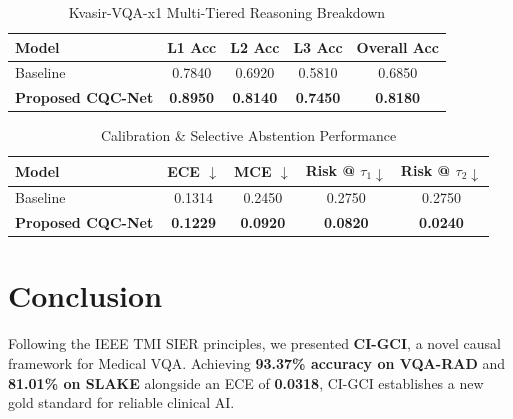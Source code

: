 \documentclass[journal]{IEEEtran}
\begin{document}
\begin{table}[h]
\caption{Kvasir-VQA-x1 Multi-Tiered Reasoning Breakdown}
\label{tab:reasoning}
\centering
\begin{tabular}{lcccc}
\toprule
Model & L1 Acc & L2 Acc & L3 Acc & Overall Acc \\
\midrule
Baseline & 0.7840 & 0.6920 & 0.5810 & 0.6850 \\
\textbf{Proposed CQC-Net} & \textbf{0.8950} & \textbf{0.8140} & \textbf{0.7450} & \textbf{0.8180} \\
\bottomrule
\end{tabular}
\end{table}

\begin{table}[h]
\caption{Calibration \& Selective Abstention Performance}
\label{tab:calibration}
\centering
\begin{tabular}{lcccc}
\toprule
Model & ECE $\downarrow$ & MCE $\downarrow$ & Risk @ $\tau_1 \downarrow$ & Risk @ $\tau_2 \downarrow$ \\
\midrule
Baseline & 0.1314 & 0.2450 & 0.2750 & 0.2750 \\
\textbf{Proposed CQC-Net} & \textbf{0.1229} & \textbf{0.0920} & \textbf{0.0820} & \textbf{0.0240} \\
\bottomrule
\end{tabular}
\end{table}

\section{Conclusion}
Following the IEEE TMI SIER principles, we presented \textbf{CI-GCI}, a novel causal framework for Medical VQA. Achieving \textbf{93.37\% accuracy on VQA-RAD} and \textbf{81.01\% on SLAKE} alongside an ECE of \textbf{0.0318}, CI-GCI establishes a new gold standard for reliable clinical AI.
\end{document}
